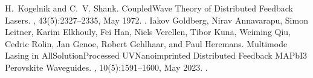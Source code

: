 \documentclass[a4paper,10pt,english,openany,oneside]{jupyterBook}
\begin{document}
\begin{sphinxthebibliography}{1}
\sphinxAtStartPar
H. Kogelnik and C. V. Shank. Coupled\sphinxhyphen{}Wave Theory of Distributed Feedback Lasers. , 43(5):2327–2335, May 1972. .
\sphinxAtStartPar
Iakov Goldberg, Nirav Annavarapu, Simon Leitner, Karim Elkhouly, Fei Han, Niels Verellen, Tibor Kuna, Weiming Qiu, Cedric Rolin, Jan Genoe, Robert Gehlhaar, and Paul Heremans. Multimode Lasing in All\sphinxhyphen{}Solution\sphinxhyphen{}Processed UV\sphinxhyphen{}Nanoimprinted Distributed Feedback MAPbI3 Perovskite Waveguides. , 10(5):1591–1600, May 2023. .
\end{sphinxthebibliography}







\renewcommand{\indexname}{Index}
\printindex
\end{document}
